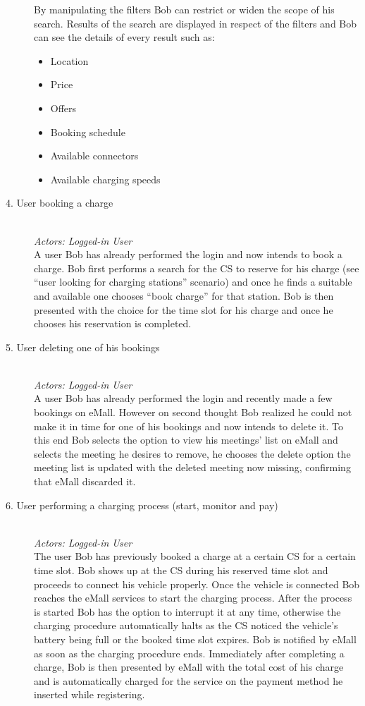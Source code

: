 \documentclass[11pt]{article}
\begin{document}
\begin{description}
\begin{itemize}
        \end{itemize}
        By manipulating the filters Bob can restrict or widen the scope of his search. Results of the search are displayed in respect of the filters and Bob can see the details of every result such as:
        \begin{itemize}
            \item Location
            \item Price
            \item Offers
            \item Booking schedule
            \item Available connectors
            \item Available charging speeds
        \end{itemize}
    \item [4. User booking a charge] \hfill \\
        \textit{Actors: Logged-in User} \\
        A user Bob has already performed the login and now intends to book a charge. Bob first performs a search for the CS to reserve for his charge (see “user looking for charging stations” scenario) and once he finds a suitable and available one chooses “book charge” for that station. Bob is then presented with the choice for the time slot for his charge and once he chooses his reservation is completed.
    \item [5. User deleting one of his bookings] \hfill \\
        \textit{Actors: Logged-in User} \\
        A user Bob has already performed the login and recently made a few bookings on eMall. However on second thought Bob realized he could not make it in time for one of his bookings and now intends to delete it. To this end Bob selects the option to view his meetings' list on eMall and selects the meeting he desires to remove, he chooses the delete option the meeting list is updated with the deleted meeting now missing, confirming that eMall discarded it.
    \item [6. User performing a charging process (start, monitor and pay)] \hfill \\
        \textit{Actors: Logged-in User} \\
        The user Bob has previously booked a charge at a certain CS for a certain time slot. Bob shows up at the CS during his reserved time slot and proceeds to connect his vehicle properly. Once the vehicle is connected Bob reaches the eMall services to start the charging process. After the process is started Bob has the option to interrupt it at any time, otherwise the charging procedure automatically halts as the CS noticed the vehicle’s battery being full or the booked time slot expires. Bob is notified by eMall as soon as the charging procedure ends. Immediately after completing a charge, Bob is then presented by eMall with the total cost of his charge and is automatically charged for the service on the payment method he inserted while registering.

\end{description}
\end{document}
